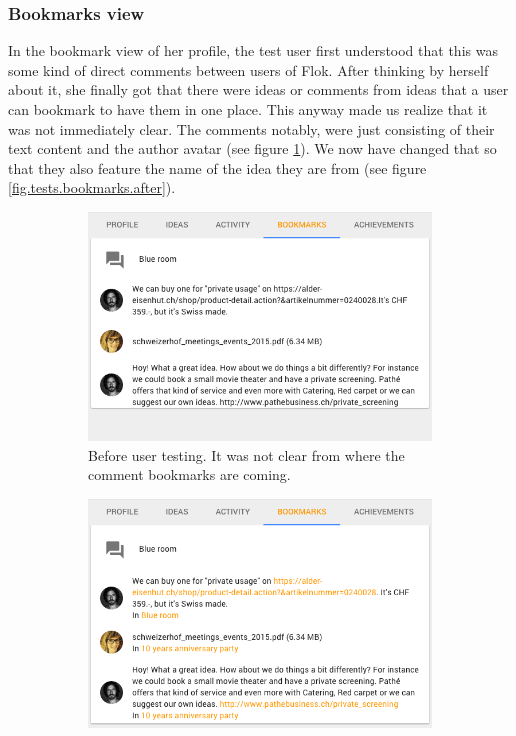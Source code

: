 \documentclass[a4paper,12pt,twoside]{article}
\begin{document}
\subsubsection*{Bookmarks view}
In the bookmark view of her profile, the test user first understood that this was some kind of direct comments between users of Flok.
After thinking by herself about it, she finally got that there were ideas or comments from ideas that a user can bookmark to have them in one place.
This anyway made us realize that it was not immediately clear.
The comments notably, were just consisting of their text content and the author avatar (see figure \ref{fig.tests.bookmarks.before}).
We now have changed that so that they also feature the name of the idea they are from (see figure \ref{fig.tests.bookmarks.after}).

\begin{figure}[!htb]
    \begin{subfigure}[t]{.495\textwidth}
        \includegraphics[width=\textwidth]{images/user_tests/bookmarks_before.png}
        \caption{Before user testing. It was not clear from where the comment bookmarks are coming.}
        \label{fig.tests.bookmarks.before}
    \end{subfigure}
    \hfill
    \begin{subfigure}[t]{.495\textwidth}
        \includegraphics[width=\textwidth]{images/user_tests/bookmarks_after.png}

\end{subfigure}
\end{figure}
\end{document}
